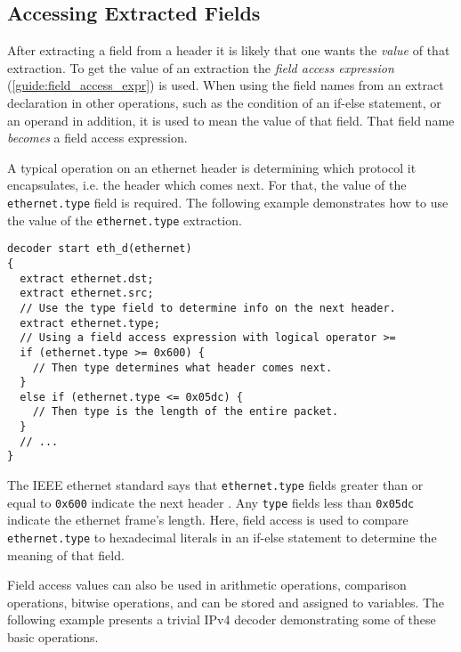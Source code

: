 \subsection{Accessing Extracted Fields} \label{tut:decoder_access}

After extracting a field from a header it is likely that one wants the
\textit{value} of that extraction. To get the value of an extraction
the \textit{field access expression} (\ref{guide:field_access_expr}) is used. When
using the field names from an extract declaration in other operations, such as
the condition of an if-else statement, or an operand in addition, it is used to
mean the value of that field. That field name \textit{becomes} a field access
expression.

A typical operation on an ethernet header is determining which protocol
it encapsulates, i.e. the header which comes next. For that, the value of the \texttt{ethernet.type} field is required.
The following example demonstrates how to use the value of the \texttt{ethernet.type} extraction.

\begin{codepage}
\begin{lstlisting}
decoder start eth_d(ethernet)
{
  extract ethernet.dst;
  extract ethernet.src;
  // Use the type field to determine info on the next header.
  extract ethernet.type;
  // Using a field access expression with logical operator >=
  if (ethernet.type >= 0x600) {
    // Then type determines what header comes next.
  }
  else if (ethernet.type <= 0x05dc) {
    // Then type is the length of the entire packet.
  }
  // ...
}
\end{lstlisting}
\end{codepage}

The IEEE ethernet standard says that \texttt{ethernet.type} fields greater than or equal
to \texttt{0x600} indicate the next header \cite{eth_std}. Any \texttt{type}
fields less than \texttt{0x05dc} indicate the ethernet frame's length. Here, field access is used to compare \texttt{ethernet.type} to hexadecimal literals in an
if-else statement to determine the meaning of that field.

Field access values can also be used in arithmetic operations, comparison operations, bitwise operations,
and can be stored and assigned to variables. The following example presents
a trivial IPv4 decoder demonstrating some of these basic operations.

